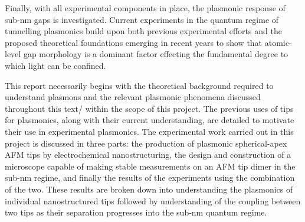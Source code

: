 \documentclass[12pt, a4paper, twoside]{book}
\begin{document}
Finally, with all experimental components in place, the plasmonic response of sub-nm gaps is investigated. Current experiments in the quantum regime of tunnelling plasmonics build upon both previous experimental efforts and the proposed theoretical foundations emerging in recent years to show that atomic-level gap morphology is a dominant factor effecting the fundamental degree to which light can be confined.

This report necessarily begins with the theoretical background required to understand plasmons and the relevant plasmonic phenomena discussed throughout this text/ within the scope of this project. The previous uses of tips for plasmonics, along with their current understanding, are detailed to motivate their use in experimental plasmonics.
The experimental work carried out in this project is discussed in three parts: the production of plasmonic spherical-apex AFM tips by electrochemical nanostructuring, the design and construction of a microscope capable of making stable measurements on an AFM tip dimer in the sub-nm regime, and finally the results of the experiments using the combination of the two. These results are broken down into understanding the plasmonics of individual nanostructured tips followed by understanding of the coupling between two tips as their separation progresses into the sub-nm quantum regime.

\ifstandalone
\begin{singlespace}
\fontsize{8pt}{1em}\selectfont
\printbibliography[notcategory=fullcited]
\end{singlespace}
\fi
\end{document}
